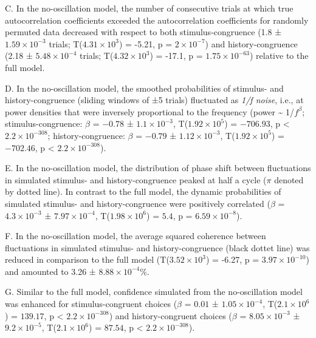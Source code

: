\documentclass[
]{article}
\begin{document}
C. In the no-oscillation model, the number of consecutive trials at
which true autocorrelation coefficients exceeded the autocorrelation
coefficients for randomly permuted data decreased with respect to both
stimulus-congruence (1.8 ± \ensuremath{1.59\times 10^{-3}} trials;
T(\ensuremath{4.31\times 10^{3}}) = -5.21, p =
\(\ensuremath{2\times 10^{-7}}\)) and history-congruence (2.18 ±
\ensuremath{5.48\times 10^{-4}} trials;
T(\ensuremath{4.32\times 10^{3}}) = -17.1, p =
\(\ensuremath{1.75\times 10^{-63}}\)) relative to the full model.

D. In the no-oscillation model, the smoothed probabilities of stimulus-
and history-congruence (sliding windows of ±5 trials) fluctuated as
\emph{1/f noise}, i.e., at power densities that were inversely
proportional to the frequency (power \textasciitilde{} 1/\(f^\beta\);
stimulus-congruence: \(\beta\) = \(-0.78\) ±
\(\ensuremath{1.1\times 10^{-3}}\),
T(\(\ensuremath{1.92\times 10^{5}}\)) = \(-706.93\), p < \(\ensuremath{2.2\times 10^{-308}}\);
history-congruence: \(\beta\) = \(-0.79\) ±
\(\ensuremath{1.12\times 10^{-3}}\),
T(\(\ensuremath{1.92\times 10^{5}}\)) = \(-702.46\), p < \(\ensuremath{2.2\times 10^{-308}}\)).

E. In the no-oscillation model, the distribution of phase shift between
fluctuations in simulated stimulus- and history-congruence peaked at
half a cycle (\(\pi\) denoted by dotted line). In contrast to the full
model, the dynamic probabilities of simulated stimulus- and
history-congruence were positively correlated (\(\beta\) =
\(\ensuremath{4.3\times 10^{-3}}\) ±
\(\ensuremath{7.97\times 10^{-4}}\),
T(\(\ensuremath{1.98\times 10^{6}}\)) = \(5.4\), p =
\(\ensuremath{6.59\times 10^{-8}}\)).

F. In the no-oscillation model, the average squared coherence between
fluctuations in simulated stimulus- and history-congruence (black dottet
line) was reduced in comparison to the full model
(T(\ensuremath{3.52\times 10^{3}}) = -6.27, p =
\(\ensuremath{3.97\times 10^{-10}}\)) and amounted to 3.26 ±
\ensuremath{8.88\times 10^{-4}}\%.

G. Similar to the full model, confidence simulated from the
no-oscillation model was enhanced for stimulus-congruent choices
(\(\beta\) = \(0.01\) ± \(\ensuremath{1.05\times 10^{-4}}\),
T(\(\ensuremath{2.1\times 10^{6}}\)) = \(139.17\), p < \(\ensuremath{2.2\times 10^{-308}}\)) and
history-congruent choices (\(\beta\) =
\(\ensuremath{8.05\times 10^{-3}}\) ±
\(\ensuremath{9.2\times 10^{-5}}\), T(\(\ensuremath{2.1\times 10^{6}}\))
= \(87.54\), p < \(\ensuremath{2.2\times 10^{-308}}\)).
\end{document}
